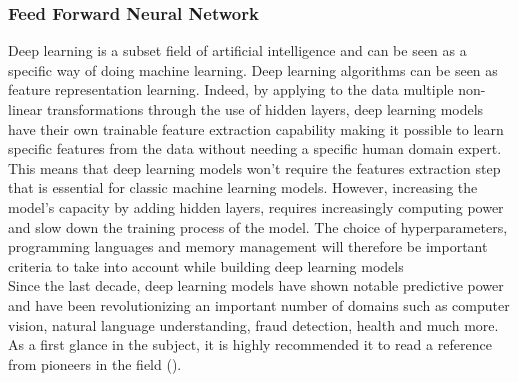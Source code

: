 \documentclass[letter,8pt]{article}\usepackage[]{graphicx}\usepackage[]{color}
\begin{document}
\subsubsection{Feed Forward Neural Network}

Deep learning is a subset field of artificial intelligence and can be seen as a specific way of doing machine learning. Deep learning algorithms can be seen as feature representation learning. Indeed, by applying to the data multiple non-linear transformations through the use of hidden layers, deep learning models have their own trainable feature extraction capability making it possible to learn specific features from the data without needing a specific human domain expert. This means that deep learning models won't require the features extraction step that is essential for classic machine learning models. However, increasing the model’s capacity by adding hidden layers, requires increasingly computing power and slow down the training process of the model. The choice of hyperparameters, programming languages and memory management will therefore be important criteria to take into account while building deep learning models\\
Since the last decade, deep learning models have shown notable predictive power and have been revolutionizing an important number of domains such as computer vision, natural language understanding, fraud detection, health and much more.\\
As a first glance in the subject, it is highly recommended it to read  a reference from pioneers in the field (\cite[Chapter 1]{Goodfellow-et-al-2016}).
\end{document}
